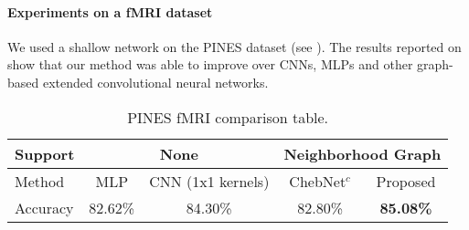 \paragraph{Experiments on a fMRI dataset}
We used a shallow network on the PINES dataset (see ). The results reported on  show that our method was able to improve over CNNs, MLPs and other graph-based extended convolutional neural networks.

\begin{table}[h!]
\centering
\caption{PINES fMRI comparison table.}
\label{tab:iaps-table}
\begin{tabular}{|l||c|c||c|c|}
\hline
\multicolumn{1}{|l||}{Support} & \multicolumn{2}{c||}{None} & \multicolumn{2}{c|}{Neighborhood Graph}     \\ \hline
Method                      & MLP & CNN (1x1 kernels)                                & ChebNet$^c$ & Proposed                   \\ \hline
Accuracy                    & 82.62\% & 84.30\%                            & 82.80\%                            & \textbf{85.08\%} \\ \hline
\end{tabular}
\end{table}

